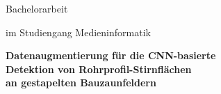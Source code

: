 \begin{titlepage}
\centering
\vspace*{2.5cm}

{\large Bachelorarbeit\par}
im Studiengang Medieninformatik
\vspace{1.6cm}

{\LARGE\bfseries Datenaugmentierung für die CNN-basierte\\[0.3em]
Detektion von Rohrprofil-Stirnflächen\\[0.3em]
an gestapelten Bauzaunfeldern\par}


\end{titlepage}
